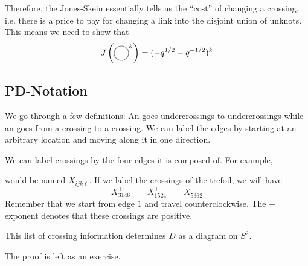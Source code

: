 \documentclass{article}
\begin{document}
Therefore, the Jones-Skein essentially tells us the ``cost'' of changing a crossing, i.e. there is a price to pay for changing a link into the disjoint union of unknots. This means we need to show that
\begin{equation}
    J\left(\KPA^k\right)=(-q^{1/2}-q^{-1/2})^k
\end{equation}
\subsection{PD-Notation}
We go through a few definitions: An  goes undercrossings to undercrossings while an  goes from a crossing to a crossing. We can label the edges by starting at an arbitrary location and moving along it in one direction.
\begin{center}
\end{center}\vspace{-6mm}
We can label crossings by the four edges it is composed of. For example,
\begin{center}
\end{center}
would be named $X_{ijk\ell}.$ If we label the crossings of the trefoil, we will have 
\begin{equation}
    X^+_{3146}\quad\quad X^+_{1524}\quad\quad X^+_{5362}
\end{equation}
Remember that we start from edge $1$ and travel counterclockwise. The $+$ exponent denotes that these crossings are positive.
\begin{theorem}
    This list of crossing information determines $D$ as a diagram on $S^2.$
\end{theorem}
The proof is left as an exercise.
\end{document}
